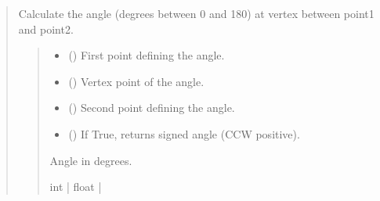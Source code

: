 \documentclass[letterpaper,10pt,english]{sphinxmanual}
\begin{document}
\begin{quote}
\begin{fulllineitems}

\begin{fulllineitems}
\label{\detokenize{pygeox:pygeox.geoscene.GeoScene.angle}}
\pysigstartsignatures
\pysiglinewithargsret
{}
{\sphinxparamcomma {}\sphinxparamcomma {}\sphinxparamcomma {}}
{}
\pysigstopsignatures
\sphinxAtStartPar
Calculate the angle (degrees between 0 and 180) at vertex between point1 and point2.
\begin{quote}\begin{description}
\begin{itemize}
\item {} 
\sphinxAtStartPar
{} () \textendash{} First point defining the angle.

\item {} 
\sphinxAtStartPar
{} () \textendash{} Vertex point of the angle.

\item {} 
\sphinxAtStartPar
{} () \textendash{} Second point defining the angle.

\item {} 
\sphinxAtStartPar
{} () \textendash{} If True, returns signed angle (CCW positive).

\end{itemize}

\sphinxAtStartPar
Angle in degrees.

\sphinxAtStartPar
int | float | 

\end{description}\end{quote}

\end{fulllineitems}



\end{fulllineitems}
\end{quote}
\end{document}
